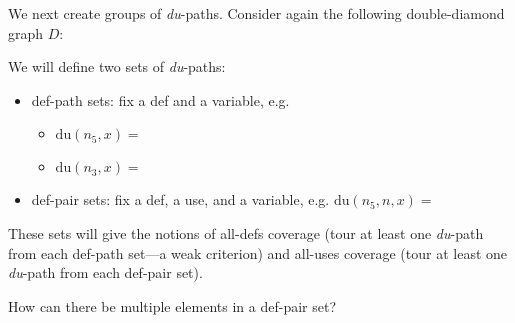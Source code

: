 \documentclass[11pt]{article}
\begin{document}
We next create groups of \emph{du}-paths. Consider
again the following double-diamond graph $D$:
\begin{center}
\label{D}
\end{center}

We will define two sets of {\em du}-paths:
\begin{itemize}
\item def-path sets: fix a def and a variable, e.g. 
\begin{itemize} 
\item $\mbox{du}(n_5, x) =$
\item $\mbox{du}(n_3, x) =$
\end{itemize}
\item def-pair sets: fix a def, a use, and a variable, 
e.g. $\mbox{du}(n_5, n, x) =$
\end{itemize}

These sets will give the notions of all-defs coverage (tour at least
one {\em du}-path from each def-path set---a weak criterion) and all-uses
coverage (tour at least one {\em du}-path from each def-pair set).

{\sf How can there be multiple elements in a def-pair set?}

\newpage
\end{document}
